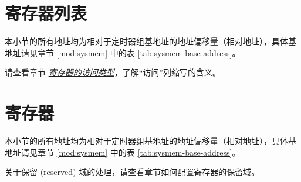 \documentclass[main\_\_CN.tex]{subfiles}
\begin{document}



\newpage
\hypertarget{timg-reg-summ}{}
\section{寄存器列表}
\label{sec:timg-reg-summ}

本小节的所有地址均为相对于定时器组基地址的地址偏移量（相对地址），具体基地址请见章节 \ref{mod:sysmem} \textit{} 中的表 \ref{tab:sysmem-base-address}。

请查看章节 \hyperref[glossary-access-types]{\textit{寄存器的访问类型}}，了解“访问”列缩写的含义。






\newpage
\section{寄存器}

本小节的所有地址均为相对于定时器组基地址的地址偏移量（相对地址），具体基地址请见章节 \ref{mod:sysmem} \textit{} 中的表 \ref{tab:sysmem-base-address}。

关于保留 (reserved) 域的处理，请查看章节\hyperref[programming-reserved-field]{如何配置寄存器的保留域}。


\end{document}
